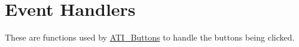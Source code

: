 \hypertarget{group___a_t_i_buttons_handlers}{}\section{Event Handlers}
\label{group___a_t_i_buttons_handlers}
These are functions used by \hyperlink{class_a_t_i___buttons}{A\+T\+I\+\_\+\+Buttons} to handle the buttons being clicked. 